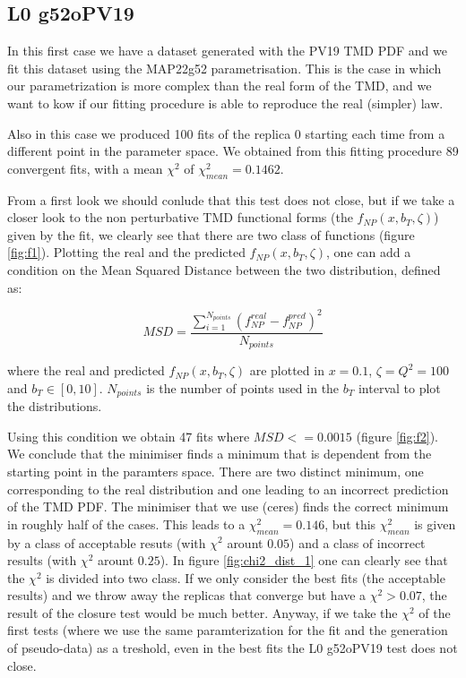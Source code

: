 \documentclass[12pt]{report}
\begin{document}
\subsection{L0 g52oPV19}
In this first case we have a dataset generated with the PV19 TMD PDF and we fit this dataset using the MAP22g52 parametrisation. This is the case in which our parametrization is more complex than the real form of the TMD, and we want to kow if our fitting procedure is able to reproduce the real (simpler) law. 

Also in this case we produced 100 fits of the replica 0 starting each time from a different point in the parameter space. We obtained from this fitting procedure 89 convergent fits, with a mean $\chi ^ 2$ of $\chi^2_{mean} = 0.1462$.

From a first look we should conlude that this test does not close, but if we take a closer look to the non perturbative TMD functional  forms (the $f_{NP}(x, b_T, \zeta)$) given by the fit, we clearly see that there are two class of functions (figure \ref{fig:f1}). Plotting the real and the predicted $f_{NP}(x, b_T, \zeta)$, one can add a condition on the Mean Squared Distance between the two distribution, defined as:

\begin{equation}
    MSD = \frac{\sum_{i=1}^{N_{points}}(f_{NP}^{real} - f_{NP}^{pred})^2}{N_{points}} \label{eq:msd}
\end{equation}

where the real and predicted $f_{NP}(x, b_T, \zeta)$ are plotted in $x = 0.1$, $\zeta = Q^2 = 100$ and $b_T \in [0, 10]$. $N_{points}$ is the number of points used in the $b_T$ interval to plot the distributions.

Using this condition we obtain 47 fits where $MSD <= 0.0015$ (figure \ref{fig:f2}). \\

We conclude that the minimiser finds a minimum that is dependent from the starting point in the paramters space. There are two distinct minimum, one corresponding to the real distribution and one leading to an incorrect prediction of the TMD PDF. The minimiser that we use (ceres) finds the correct minimum in roughly half of the cases. This leads to a $\chi^2_{mean} = 0.146$, but this $\chi^2_{mean}$ is given by a class of acceptable resuts (with $\chi^2$ arount $0.05$) and a class of incorrect results (with $\chi^2$ arount $0.25$). In figure \ref{fig:chi2_dist_1} one can clearly see that the $\chi^2$ is divided into two class. If we only consider the best fits (the acceptable results) and we throw away the replicas that converge but have a $\chi^2 > 0.07$, the result of the closure test would be much better. Anyway, if we take the $\chi^2$ of the first tests (where we use the same paramterization for the fit and the generation of pseudo-data) as a treshold, even in the best fits the L0 g52oPV19 test does not close. 
\end{document}
